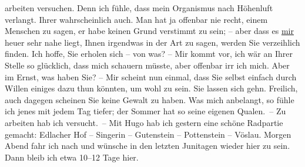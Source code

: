 \begin{ledgroupsized}[t]{13cm}
               arbeiten versuchen. Denn ich fühle, dass mein Organismus nach Höhenluft verlangt.
               Ihrer wahrscheinlich auch. Man hat ja offenbar nie recht, einem Menschen zu sagen, er
               habe keinen Grund verstimmt zu sein; – aber dass es \uline{mir} heuer sehr nahe liegt, Ihnen irgendwas in der Art zu sagen, werden Sie
               verzeihlich finden. Ich hoffe, Sie erholen sich – von was? – Mir kommt vor, ich wär
               an Ihrer Stelle so glücklich, dass mich schauern müsste, aber offenbar irr ich mich.
               Aber im Ernst, was haben Sie? – Mir scheint nun einmal, dass Sie selbst einfach durch
               Willen einiges dazu thun könnten, um wohl zu sein. Sie lassen sich gehn. Freilich,
               auch dagegen scheinen Sie keine Gewalt zu haben.\pend
           \pstart
           Was mich anbelangt, so fühle ich jenes \label{K_L00928_1v}\label{K_L00928_1h} mit {\pb}jedem Tag tiefer; der Sommer
               hat so seine eigenen Qualen. – Zu arbeiten hab ich versucht. – Mit Hugo hab ich gestern eine schöne Radpartie
               gemacht: Edlacher Hof – Singerin – Gutenstein – Pottenstein – Vöslau.\pend
           \pstart
           Morgen Abend fahr ich nach \label{K_L00928-88v}\label{K_L00928-88h} und wünsche in den
               letzten Junitagen wieder hier zu sein. Dann bleib ich etwa 10–12 Tage
               hier.\pend
           \pstart

\end{ledgroupsized}
